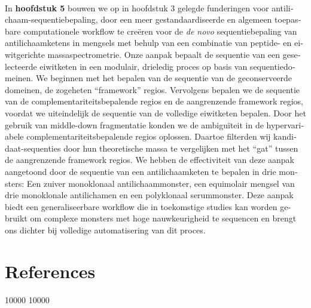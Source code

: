 \begin{otherlanguage}{dutch}
  \bigskip\\
  In \textbf{hoofdstuk 5} bouwen we op in hoofdstuk 3 gelegde funderingen voor antilichaam-sequentiebepaling, door een meer gestandaardiseerde en algemeen toepasbare computationele workflow te creëren voor de \emph{de novo} sequentiebepaling van antilichaamketens in mengsels met behulp van een combinatie van peptide- en eiwitgerichte massaspectrometrie. Onze aanpak bepaalt de sequentie van een geselecteerde eiwitketen in een modulair, drieledig proces op basis van sequentiedomeinen. We beginnen met het bepalen van de sequentie van de geconserveerde domeinen, de zogeheten “framework” regios. Vervolgens bepalen we de sequentie van de complementariteitsbepalende regios en de aangrenzende framework regios, voordat we uiteindelijk de sequentie van de volledige eiwitketen bepalen. Door het gebruik van middle-down fragmentatie konden we de ambiguïteit in de hypervariabele complementariteitsbepalende regios oplossen. Daartoe filterden wij kandidaat-sequenties door hun theoretische massa te vergelijken met het “gat” tussen de aangrenzende framework regios. We hebben de effectiviteit van deze aanpak aangetoond door de sequentie van een antilichaamketen te bepalen in drie monsters: Een zuiver monoklonaal antilichaammonster, een equimolair mengsel van drie monoklonale antilichamen en een polyklonaal serummonster. Deze aanpak biedt een generaliseerbare workflow die in toekomstige studies kan worden gebruikt om complexe monsters met hoge nauwkeurigheid te sequencen en brengt ons dichter bij volledige automatisering van dit proces.\\
\end{otherlanguage}


\clearpage
\section*{References}

\patchcmd{\thebibliography}
{}
{ 10000  10000}
{}{}

\stopthumb

